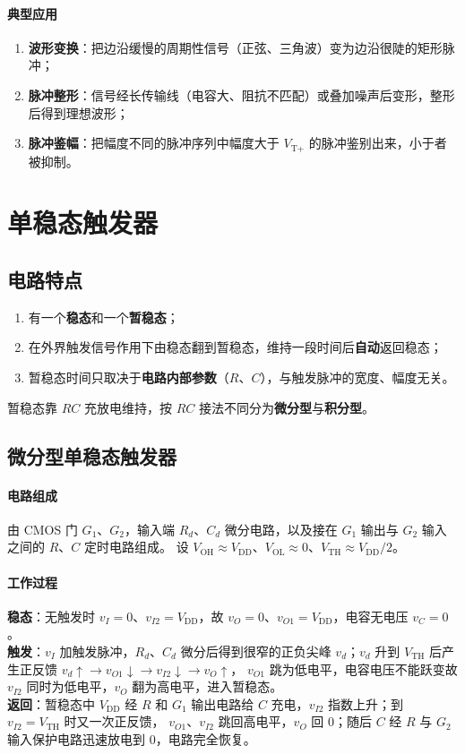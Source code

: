 \paragraph{典型应用}
\begin{enumerate}
    \item \textbf{波形变换}：把边沿缓慢的周期性信号（正弦、三角波）变为边沿很陡的矩形脉冲；
    \item \textbf{脉冲整形}：信号经长传输线（电容大、阻抗不匹配）或叠加噪声后变形，整形后得到理想波形；
    \item \textbf{脉冲鉴幅}：把幅度不同的脉冲序列中幅度大于 $V_{\text{T}+}$ 的脉冲鉴别出来，小于者被抑制。
\end{enumerate}

\section{单稳态触发器}
\subsection{电路特点}
\begin{enumerate}
    \item 有一个\textbf{稳态}和一个\textbf{暂稳态}；
    \item 在外界触发信号作用下由稳态翻到暂稳态，维持一段时间后\textbf{自动}返回稳态；
    \item 暂稳态时间只取决于\textbf{电路内部参数}（$R$、$C$），与触发脉冲的宽度、幅度无关。
\end{enumerate}
暂稳态靠 $RC$ 充放电维持，按 $RC$ 接法不同分为\textbf{微分型}与\textbf{积分型}。

\subsection{微分型单稳态触发器}
\paragraph{电路组成}
由 CMOS 门 $G_1$、$G_2$，输入端 $R_d$、$C_d$ 微分电路，以及接在 $G_1$ 输出与 $G_2$ 输入之间的 $R$、$C$ 定时电路组成。
设 $V_\text{OH}\approx V_\text{DD}$、$V_\text{OL}\approx0$、$V_\text{TH}\approx V_\text{DD}/2$。

\paragraph{工作过程}
\textbf{稳态}：无触发时 $v_I=0$、$v_{I2}=V_\text{DD}$，故 $v_O=0$、$v_{O1}=V_\text{DD}$，电容无电压 $v_C=0$。\\
\textbf{触发}：$v_I$ 加触发脉冲，$R_d$、$C_d$ 微分后得到很窄的正负尖峰 $v_d$；$v_d$ 升到 $V_\text{TH}$ 后产生正反馈
$v_d\uparrow\rightarrow v_{O1}\downarrow\rightarrow v_{I2}\downarrow\rightarrow v_O\uparrow$，
$v_{O1}$ 跳为低电平，电容电压不能跃变故 $v_{I2}$ 同时为低电平，$v_O$ 翻为高电平，进入暂稳态。\\
\textbf{返回}：暂稳态中 $V_\text{DD}$ 经 $R$ 和 $G_1$ 输出电路给 $C$ 充电，$v_{I2}$ 指数上升；到 $v_{I2}=V_\text{TH}$ 时又一次正反馈，
$v_{O1}$、$v_{I2}$ 跳回高电平，$v_O$ 回 0；随后 $C$ 经 $R$ 与 $G_2$ 输入保护电路迅速放电到 0，电路完全恢复。

